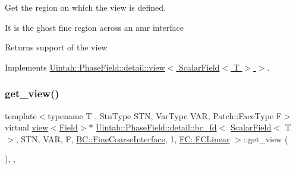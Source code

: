 Get the region on which the view is defined. 

It is the ghost fine region across an amr interface

\begin{DoxyReturn}{Returns}
support of the view 
\end{DoxyReturn}


Implements \hyperlink{classUintah_1_1PhaseField_1_1detail_1_1view_3_01ScalarField_3_01T_01_4_01_4_a3e14b0c7a57a57707bb33954861ab1c1}{Uintah\+::\+Phase\+Field\+::detail\+::view$<$ Scalar\+Field$<$ T $>$ $>$}.

\mbox{\label{classUintah_1_1PhaseField_1_1detail_1_1bc__fd_3_01ScalarField_3_01T_01_4_00_01STN_00_01VAR_00_01f836207db876ecd28bf65f631f79030f_abc3b93271050f310bc7f6095ccb19d08}} 
\subsubsection{\texorpdfstring{get\+\_\+view()}{get\_view()}\hspace{0.1cm}{\footnotesize\ttfamily [1/2]}}
{\footnotesize\ttfamily template$<$typename T , Stn\+Type S\+TN, Var\+Type V\+AR, Patch\+::\+Face\+Type F$>$ \\
virtual \hyperlink{classUintah_1_1PhaseField_1_1detail_1_1view}{view}$<$\hyperlink{structUintah_1_1PhaseField_1_1ScalarField}{Field}$>$$\ast$ \hyperlink{classUintah_1_1PhaseField_1_1detail_1_1bc__fd}{Uintah\+::\+Phase\+Field\+::detail\+::bc\+\_\+fd}$<$ \hyperlink{structUintah_1_1PhaseField_1_1ScalarField}{Scalar\+Field}$<$ T $>$, S\+TN, V\+AR, F, \hyperlink{namespaceUintah_1_1PhaseField_a148fba372aa3be96fd6eede7a2fa10b5ad2d89be9637ff8b537fa4b6026c0e574}{B\+C\+::\+Fine\+Coarse\+Interface}, 1, \hyperlink{namespaceUintah_1_1PhaseField_aeb51fe956fe07f1487f5878f4039f27ca7460527a4d3065117218d8822530ed6a}{F\+C\+::\+F\+C\+Linear} $>$\+::get\+\_\+view (\begin{DoxyParamCaption}{ }\end{DoxyParamCaption})\hspace{0.3cm}{\ttfamily [inline]}, {\ttfamily [override]}, {\ttfamily [virtual]}}



